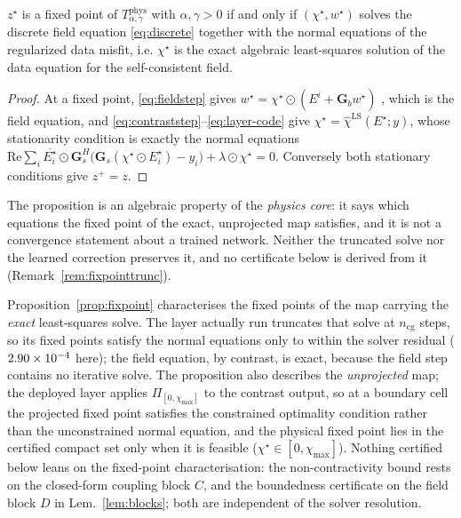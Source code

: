 \documentclass[journal,cmes,article,submit,moreauthors,pdftex]{Definitions/tsp}
\newcommand{\numv}[1]{#1}
\begin{document}
\begin{Proposition}\label{prop:fixpoint}
$z^\star$ is a fixed point of $T^{\mathrm{phys}}_{\alpha,\gamma}$ with $\alpha,\gamma>0$ if and
only if $(\chi^\star,w^\star)$ solves the discrete field equation \eqref{eq:discrete} together with
the normal equations of the regularized data misfit, i.e. $\chi^\star$ is the exact algebraic
least-squares solution of the data equation for the self-consistent field.
\end{Proposition}
\begin{proof}
At a fixed point, \eqref{eq:fieldstep} gives $w^\star=\chi^\star\odot(E^i+\mathbf{G}_bw^\star)$
, which is the field equation, and \eqref{eq:contraststep}--\eqref{eq:layer-code} give $\chi^\star=
\hat\chi^{\mathrm{LS}}(E^\star;y)$, whose stationarity condition is exactly the normal equations
$\mathrm{Re}\sum_i \overline{E^\star_i}\odot\mathbf{G}_s^{H}\big(\mathbf{G}_s(\chi^\star\odot
E^\star_i)-y_i\big)+\lambda\odot\chi^\star=0$. Conversely both stationary conditions give
$z^+=z$.
\end{proof}
The proposition is an algebraic property of the \emph{physics core}: it says which equations the
fixed point of the exact, unprojected map satisfies, and it is not a convergence statement about a
trained network. Neither the truncated solve nor the learned correction preserves it, and no
certificate below is derived from it (Remark~\ref{rem:fixpointtrunc}).
\begin{Remark}\label{rem:fixpointtrunc}
Proposition~\ref{prop:fixpoint} characterises the fixed points of the map carrying the \emph{exact}
least-squares solve. The layer actually run truncates that solve at $n_{\mathrm{cg}}$ steps, so its
fixed points satisfy the normal equations only to within the solver residual
($\numv{\NumCgResidImpl}$ here); the field equation, by contrast, is exact, because the field step
contains no iterative solve. The proposition also describes the \emph{unprojected} map; the deployed
layer applies $\Pi_{[0,\chi_{\max}]}$ to the contrast output, so at a boundary cell the projected
fixed point satisfies the constrained optimality condition rather than the unconstrained normal
equation, and the physical fixed point lies in the certified compact set only when it is feasible
($\chi^\star\in[0,\chi_{\max}]$). Nothing certified below leans on the fixed-point characterisation:
the non-contractivity bound rests on the closed-form coupling block $C$, and the boundedness
certificate on the field block $D$ in Lem.~\ref{lem:blocks}; both are independent of the
solver resolution.
\end{Remark}
\end{document}
